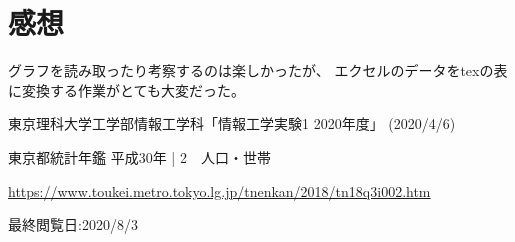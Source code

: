 \documentclass[12pt]{jarticle}
\begin{document}
\section{感想}
グラフを読み取ったり考察するのは楽しかったが、
エクセルのデータをtexの表に変換する作業がとても大変だった。
\begin{thebibliography}{99}
    \label{sannkoubunnkenn_chapter}
    東京理科大学工学部情報工学科「情報工学実験1 2020年度」
    (2020/4/6)

    東京都統計年鑑 平成30年 | 2　人口・世帯

    \url{https://www.toukei.metro.tokyo.lg.jp/tnenkan/2018/tn18q3i002.htm}

    最終閲覧日:2020/8/3

\end{thebibliography}

\appendix
\end{document}
